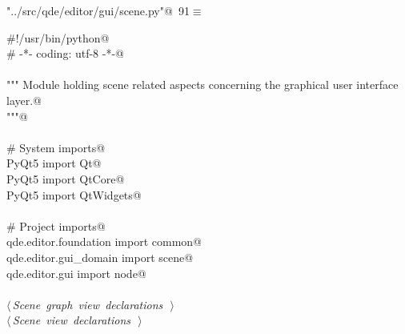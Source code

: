 \documentclass[
    a4paper,      %
    10pt,         %
    openright,    %
    notitlepage,  %
    parskip=half, %
]{scrreprt}       %
\theoremstyle{definition}                    %
\begin{document}
\begin{flushleft} \small
\begin{minipage}{\linewidth}\label{scrap146}\raggedright\small
{} \verb@"../src/qde/editor/gui/scene.py"@\nobreak\ {\footnotesize {91}}$\equiv$
\vspace{-1ex}
\begin{list}{}{} \item
\mbox{}\lstinline@#!/usr/bin/python@\\
\mbox{}\lstinline@# -*- coding: utf-8 -*-@\\
\mbox{}\lstinline@@\\
\mbox{}\lstinline@""" Module holding scene related aspects concerning the graphical user interface layer.@\\
\mbox{}\lstinline@"""@\\
\mbox{}\lstinline@@\\
\mbox{}\lstinline@# System imports@\\
\mbox{}\lstinline@from PyQt5 import Qt@\\
\mbox{}\lstinline@from PyQt5 import QtCore@\\
\mbox{}\lstinline@from PyQt5 import QtWidgets@\\
\mbox{}\lstinline@@\\
\mbox{}\lstinline@# Project imports@\\
\mbox{}\lstinline@from qde.editor.foundation import common@\\
\mbox{}\lstinline@from qde.editor.gui_domain import scene@\\
\mbox{}\lstinline@from qde.editor.gui import node@\\
\mbox{}\lstinline@@\\
\mbox{}\lstinline@@\hbox{$\langle\,${\itshape Scene graph view declarations}\nobreak\ {\footnotesize {}}$\,\rangle$}\lstinline@@\\
\mbox{}\lstinline@@\hbox{$\langle\,${\itshape Scene view declarations}\nobreak\ {\footnotesize {}}$\,\rangle$}\lstinline@@\\
\mbox{}\lstinline@@{\NWsep}
\end{list}
\vspace{-1.5ex}
\footnotesize
\begin{list}{}{\setlength{\itemsep}{-\parsep}\setlength{\itemindent}{-\leftmargin}}

\item{}
\end{list}
\end{minipage}\vspace{4ex}
\end{flushleft}
\end{document}
